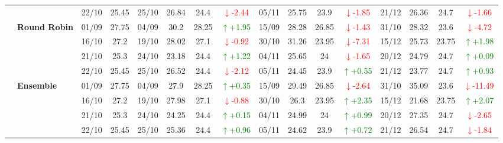 \documentclass{ieeeaccess}
\begin{document}
{\begin{longtable}{llcc|cccc|cccc|cccc}
&
& 22/10 & 25.45 & 25/10 & 26.84 & 24.4 & \textcolor{red}{\(\downarrow\)-2.44} & 05/11 & 25.75 & 23.9 & \textcolor{red}{\(\downarrow\)-1.85} & 21/12 & 26.36 & 24.7 & \textcolor{red}{\(\downarrow\)-1.66} \\
\cmidrule(lr){2-16}


& \textbf{Round Robin}
& 01/09 & 27.75 & 04/09 & 30.2 & 28.25 & \textcolor{green}{\(\uparrow\)+1.95} & 15/09 & 28.28 & 26.85 & \textcolor{red}{\(\downarrow\)-1.43} & 31/10 & 28.32 & 23.6 & \textcolor{red}{\(\downarrow\)-4.72} \\

&
& 16/10 & 27.2 & 19/10 & 28.02 & 27.1 & \textcolor{red}{\(\downarrow\)-0.92} & 30/10 & 31.26 & 23.95 & \textcolor{red}{\(\downarrow\)-7.31} & 15/12 & 25.73 & 23.75 & \textcolor{green}{\(\uparrow\)+1.98} \\

&
& 21/10 & 25.3 & 24/10 & 23.18 & 24.4 & \textcolor{green}{\(\uparrow\)+1.22} & 04/11 & 25.65 & 24 & \textcolor{red}{\(\downarrow\)-1.65} & 20/12 & 24.79 & 24.7 & \textcolor{green}{\(\uparrow\)+0.09} \\

&
& 22/10 & 25.45 & 25/10 & 26.52 & 24.4 & \textcolor{red}{\(\downarrow\)-2.12} & 05/11 & 24.45 & 23.9 & \textcolor{green}{\(\uparrow\)+0.55} & 21/12 & 23.77 & 24.7 & \textcolor{green}{\(\uparrow\)+0.93} \\
\cmidrule(lr){2-16}



& \textbf{Ensemble}
& 01/09 & 27.75 & 04/09 & 27.9 & 28.25 & \textcolor{green}{\(\uparrow\)+0.35} & 15/09 & 29.49 & 26.85 & \textcolor{red}{\(\downarrow\)-2.64} & 31/10 & 35.09 & 23.6 & \textcolor{red}{\(\downarrow\)-11.49} \\

&
& 16/10 & 27.2 & 19/10 & 27.98 & 27.1 & \textcolor{red}{\(\downarrow\)-0.88} & 30/10 & 26.3 & 23.95 & \textcolor{green}{\(\uparrow\)+2.35} & 15/12 & 21.68 & 23.75 & \textcolor{green}{\(\uparrow\)+2.07} \\

&
& 21/10 & 25.3 & 24/10 & 24.25 & 24.4 & \textcolor{green}{\(\uparrow\)+0.15} & 04/11 & 24.99 & 24 & \textcolor{green}{\(\uparrow\)+0.99} & 20/12 & 27.35 & 24.7 & \textcolor{red}{\(\downarrow\)-2.65} \\

&
& 22/10 & 25.45 & 25/10 & 25.36 & 24.4 & \textcolor{green}{\(\uparrow\)+0.96} & 05/11 & 24.62 & 23.9 & \textcolor{green}{\(\uparrow\)+0.72} & 21/12 & 26.54 & 24.7 & \textcolor{red}{\(\downarrow\)-1.84} \\


\bottomrule
\end{longtable}
}
\end{document}
